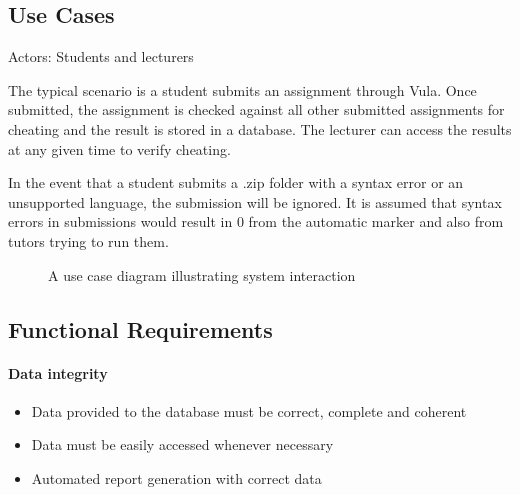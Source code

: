 \documentclass[11pt,a4paper]{article}
\begin{document}
\subsection{Use Cases}

Actors: Students and lecturers

The typical scenario is a student submits an assignment through Vula. Once submitted, the assignment is checked against all other submitted assignments for cheating and the result is stored in a database. The lecturer can access the results at any given time to verify cheating.

In the event that a student submits a .zip folder with a syntax error or an unsupported language, the submission will be ignored. It is assumed that syntax errors in submissions would result in 0 from the automatic marker and also from tutors trying to run them.

\begin{figure}[H]
  \caption{A use case diagram illustrating system interaction}
  \label{fig:usecase}
\end{figure}

\subsection{Functional Requirements}

\paragraph{Data integrity}
\begin{itemize}
    \item Data provided to the database must be correct, complete and coherent
    \item Data must be easily accessed whenever necessary
    \item Automated report generation with correct data
\end{itemize}
\end{document}
